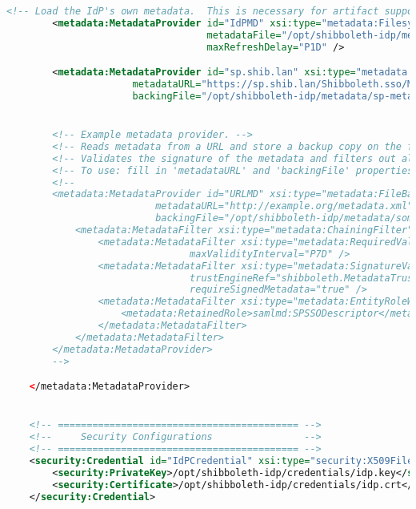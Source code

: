 \begin{lstlisting}[language=xml]
    	<!-- Load the IdP's own metadata.  This is necessary for artifact support. -->
        <metadata:MetadataProvider id="IdPMD" xsi:type="metadata:FilesystemMetadataProvider"
                                   metadataFile="/opt/shibboleth-idp/metadata/idp-metadata.xml"
                                   maxRefreshDelay="P1D" />

        <metadata:MetadataProvider id="sp.shib.lan" xsi:type="metadata:FileBackedHTTPMetadataProvider"
                      metadataURL="https://sp.shib.lan/Shibboleth.sso/Metadata"
                      backingFile="/opt/shibboleth-idp/metadata/sp-metadata.xml" />


        <!-- Example metadata provider. -->
        <!-- Reads metadata from a URL and store a backup copy on the file system. -->
        <!-- Validates the signature of the metadata and filters out all by SP entities in order to save memory -->
        <!-- To use: fill in 'metadataURL' and 'backingFile' properties on MetadataResource element -->
        <!--
        <metadata:MetadataProvider id="URLMD" xsi:type="metadata:FileBackedHTTPMetadataProvider"
                          metadataURL="http://example.org/metadata.xml"
                          backingFile="/opt/shibboleth-idp/metadata/some-metadata.xml">
            <metadata:MetadataFilter xsi:type="metadata:ChainingFilter">
                <metadata:MetadataFilter xsi:type="metadata:RequiredValidUntil"
                                maxValidityInterval="P7D" />
                <metadata:MetadataFilter xsi:type="metadata:SignatureValidation"
                                trustEngineRef="shibboleth.MetadataTrustEngine"
                                requireSignedMetadata="true" />
	            <metadata:MetadataFilter xsi:type="metadata:EntityRoleWhiteList">
                    <metadata:RetainedRole>samlmd:SPSSODescriptor</metadata:RetainedRole>
                </metadata:MetadataFilter>
            </metadata:MetadataFilter>
        </metadata:MetadataProvider>
        -->

    </metadata:MetadataProvider>


    <!-- ========================================== -->
    <!--     Security Configurations                -->
    <!-- ========================================== -->
    <security:Credential id="IdPCredential" xsi:type="security:X509Filesystem">
        <security:PrivateKey>/opt/shibboleth-idp/credentials/idp.key</security:PrivateKey>
        <security:Certificate>/opt/shibboleth-idp/credentials/idp.crt</security:Certificate>
    </security:Credential>


\end{lstlisting}
